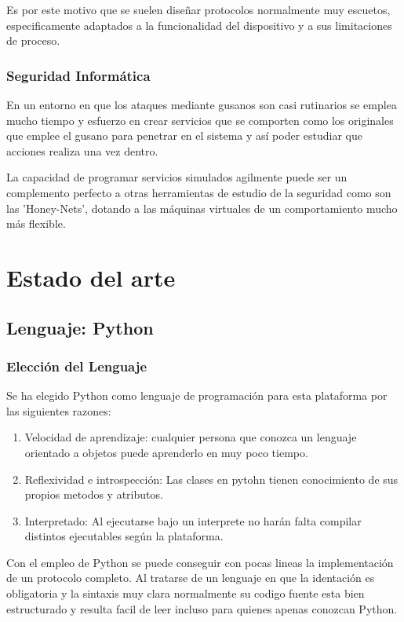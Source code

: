 \documentclass[a4paper,spanish,12pt]{book}
\begin{document}
Es por este motivo que se suelen dise\~{n}ar protocolos normalmente muy escuetos, especificamente adaptados a la funcionalidad del dispositivo y a sus limitaciones de proceso.

\subsection{Seguridad Inform\'atica}
En un entorno en que los ataques mediante gusanos son casi rutinarios se emplea mucho tiempo y esfuerzo en crear servicios que se comporten como los originales que emplee el gusano para penetrar en el sistema y as\'i poder estudiar que acciones realiza una vez dentro.

La capacidad de programar servicios simulados agilmente puede ser un complemento perfecto a otras herramientas de estudio de la seguridad como son las 'Honey-Nets', dotando a las m\'aquinas virtuales de un comportamiento mucho m\'as flexible.



\chapter{Estado del arte}

\section{Lenguaje: Python}
\subsection{Elecci\'on del Lenguaje} 
Se ha elegido Python como lenguaje de programaci\'on para esta plataforma por las siguientes razones:
\begin{enumerate}
	\item Velocidad de aprendizaje: cualquier persona que conozca un lenguaje orientado a objetos puede aprenderlo en muy poco tiempo.
	\item Reflexividad e introspección: Las clases en pytohn tienen conocimiento de sus propios metodos y atributos.
	\item Interpretado: Al ejecutarse bajo un interprete no har\'an falta compilar distintos ejecutables seg\'un la plataforma.
\end{enumerate}

Con el empleo de Python se puede conseguir con pocas lineas la implementaci\'on de un protocolo completo. Al tratarse de un lenguaje en que la identaci\'on es obligatoria y la sintaxis muy clara normalmente su codigo fuente esta bien estructurado y resulta facil de leer incluso para quienes apenas conozcan Python.
\end{document}

